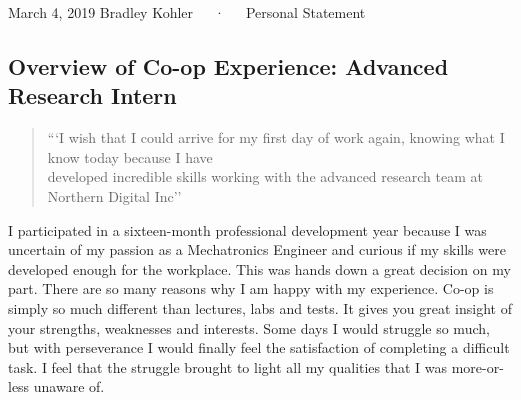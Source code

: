 \documentclass[14pt, a4paper]{awesome-cv}
\begin{document}
\makecvheader[R]

\makecvfooter
  {March 4, 2019}
  {Bradley Kohler~~~·~~~Personal Statement}
  {}

\makelettertitle

\begin{cvletter}

\section*{Overview of Co-op Experience: Advanced Research Intern}
\begin{center}
\begin{quote}
```I wish that I could arrive for my first day of work again, knowing what I know today because I have\\
developed incredible skills working with the advanced research team at Northern Digital Inc''
\end{quote}
\end{center}
I participated in a sixteen-month professional development year because I was uncertain of my passion as a Mechatronics Engineer and curious if my skills were developed enough for the workplace.  This was hands down a great decision on my part.  There are so many reasons why I am happy with my experience.  Co-op is simply so much different than lectures, labs and tests.  It gives you great insight of your strengths, weaknesses and interests.  Some days I would struggle so much, but with perseverance I would finally feel the satisfaction of completing a difficult task.  I feel that the struggle brought to light all my qualities that I was more-or-less unaware of.


\end{cvletter}
\end{document}
